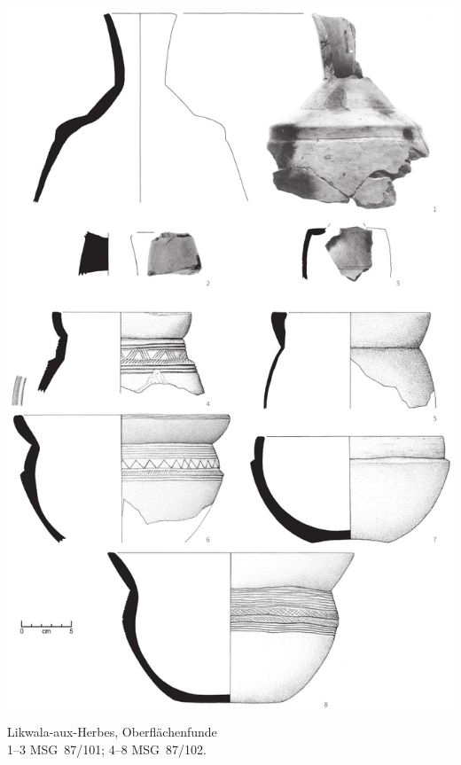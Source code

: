 \begin{pl}[H]
	\includegraphics{plt/Taf85.pdf}
	\vspace{.75em}\caption{Likwala-aux-Herbes, Oberflächenfunde \\ 1--3 MSG~87/101; 4--8 MSG~87/102.}
	\label{pl:85}
\end{pl}

